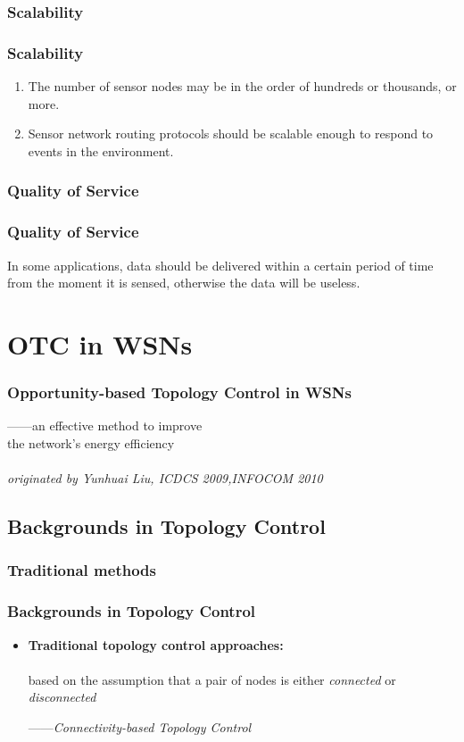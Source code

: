 \documentclass[xcolor=dvipsnames]{beamer}
\begin{document}
\subsubsection{Scalability}
\begin{frame}
\frametitle{Scalability}
\begin{enumerate}
\item<1-> The number of sensor nodes may be in the order of hundreds or thousands, or more.
\item<2-> Sensor network routing protocols should be scalable enough to respond to events in the environment.
\end{enumerate}
\end{frame}

\subsubsection{Quality of Service}
\begin{frame}
\frametitle{Quality of Service}
In some applications, data should be delivered within a certain period of time from the moment it is sensed, otherwise the data will be useless.
\end{frame}

\section{OTC in WSNs}
\begin{frame}
\frametitle{Opportunity-based Topology Control in WSNs}
\begin{flushright}
------an effective method to improve\\
 the network’s energy efficiency\\
 \indent \\
 \textit{originated by Yunhuai Liu, ICDCS 2009,INFOCOM 2010}
\end{flushright}
\end{frame}

\subsection{Backgrounds in Topology Control}
\subsubsection{Traditional methods}
\begin{frame}
\frametitle{Backgrounds in Topology Control}
\begin{itemize}
\item \textbf{Traditional topology control approaches:}\\
\indent\\
based on the assumption that a pair of nodes is either \textit{connected} or \textit{disconnected}
\indent\\
\begin{flushright}
------\textit{Connectivity-based Topology Control}
\end{flushright}
\end{itemize}
\end{frame}
\end{document}
